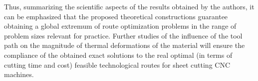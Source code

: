 \documentclass[numbers,sort&compress]{IntechOpen-Book}%
\begin{document}
Thus,
summarizing the scientific aspects of the results obtained by the authors,
it can be emphasized that the proposed
theoretical constructions guarantee obtaining a global extremum
of route optimization problems
in the range of problem sizes relevant for practice.
Further studies of the influence of the tool path on
the magnitude of thermal deformations of the material will ensure
the compliance of the obtained exact solutions
to the real optimal
(in terms of cutting time and cost)
feasible technological routes
for sheet cutting CNC machines.

\begin{backmatter}

\begin{authordetails}

\author{A. Petunin$^{1,2}$,
  A. Chentsov$^{^2}$
  and
  P. Chentsov$^2$
}

\address[1]{Ural Federal University, Ekaterinburg, Russia}
\address[2]{N.N. Krasovskii Institute of Mathematics and Mechanics, Ekaterinburg, Russia}

\address{*Address all correspondence to: 	a.a.petunin@urfu.ru}


\end{authordetails}




\end{backmatter}
\end{document}
